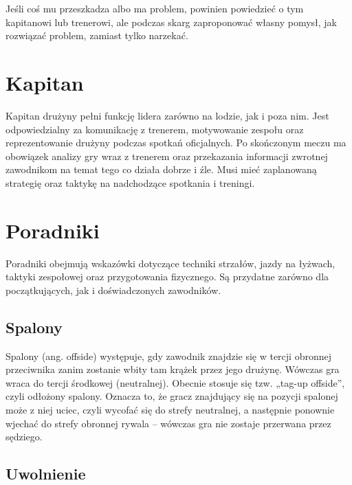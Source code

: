 \documentclass{article}
\begin{document}
Jeśli coś mu przeszkadza albo ma problem, powinien powiedzieć o tym kapitanowi lub trenerowi, ale podczas skarg zaproponować własny pomysł, jak rozwiązać problem, zamiast tylko narzekać.

\section{Kapitan}

Kapitan drużyny pełni funkcję lidera zarówno na lodzie, jak i poza nim. Jest odpowiedzialny za komunikację z trenerem, motywowanie zespołu oraz reprezentowanie drużyny podczas spotkań oficjalnych. Po skończonym meczu ma obowiązek analizy gry wraz z trenerem oraz przekazania informacji zwrotnej zawodnikom na temat tego co działa dobrze i źle. Musi mieć zaplanowaną strategię oraz taktykę na nadchodzące spotkania i treningi.

\section{Poradniki}

Poradniki obejmują wskazówki dotyczące techniki strzałów, jazdy na łyżwach, taktyki zespołowej oraz przygotowania fizycznego. Są przydatne zarówno dla początkujących, jak i doświadczonych zawodników.

\subsection{Spalony}

Spalony (ang. offside) występuje, gdy zawodnik znajdzie się w tercji obronnej przeciwnika zanim zostanie wbity tam krążek przez jego drużynę. Wówczas gra wraca do tercji środkowej (neutralnej). Obecnie stosuje się tzw. „tag-up offside”, czyli odłożony spalony. Oznacza to, że gracz znajdujący się na pozycji spalonej może z niej uciec, czyli wycofać się do strefy neutralnej, a następnie ponownie wjechać do strefy obronnej rywala – wówczas gra nie zostaje przerwana przez sędziego.

\subsection{Uwolnienie}
\end{document}
